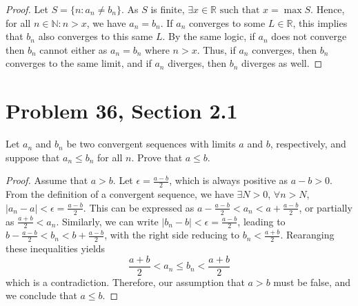 \documentclass[12pt]{article}
\begin{document}
  \begin{proof}
    Let $S = \{n : a_n \neq b_n\}$. As $S$ is finite, $\exists x \in \mathbb{R} \text{ such that } x = \max S$. Hence, for all $n \in \mathbb{N} : n > x$, we have $a_n=b_n$. If $a_n$ converges to some $L \in \mathbb{R}$, this implies that $b_n$ also converges to this same $L$. By the same logic, if $a_n$ does not converge then $b_n$ cannot either as $a_n = b_n$ where $n > x$. Thus, if $a_n$ converges, then $b_n$ converges to the same limit, and if $a_n$ diverges, then $b_n$ diverges as well.    
  \end{proof}

  \newpage

\section*{Problem 36, Section 2.1}
Let ${a_n}$ and ${b_n}$ be two convergent sequences with limits $a$ and $b$, respectively, and suppose that $a_n \leq b_n$ for all $n$. Prove that $a \leq b$.
\begin{proof} 
  Assume that $a > b$. Let $\epsilon = \frac{a - b}{2}$, which is always positive as $a - b > 0$. From the definition of a convergent sequence, we have $\exists N > 0$, $ \forall n > N$, $|a_n - a| < \epsilon = \frac{a - b}{2}$. This can be expressed as $a - \frac{a - b}{2} < a_n < a + \frac{a - b}{2}$, or partially as $\frac{a + b}{2} < a_n$. Similarly, we can write $|b_n - b| < \epsilon = \frac{a - b}{2}$, leading to  $b - \frac{a - b}{2} < b_n < b + \frac{a - b}{2}$, with the right side reducing to $b_n < \frac{a + b}{2}$. Rearanging these inequalities yields
  \[
    \frac{a + b}{2} < a_n \leq b_n < \frac{a + b}{2}
  \]
  which is a contradiction. Therefore, our assumption that $a > b$ must be false, and we conclude that $a \leq b$.

\end{proof}
  
\end{document}
